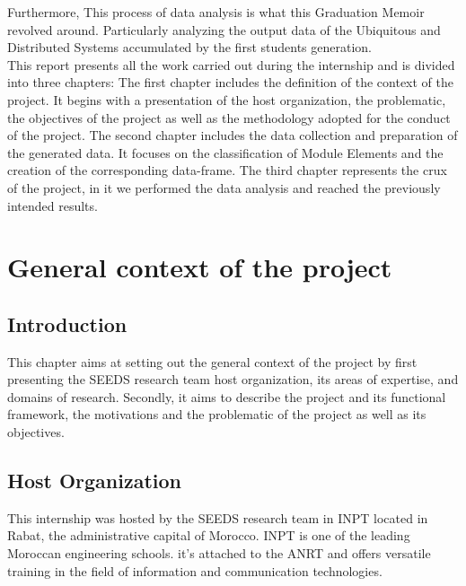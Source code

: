 \documentclass[12pt]{extreport}
\begin{document}
Furthermore, This process of data analysis is what this Graduation Memoir revolved around. Particularly analyzing the output data of the Ubiquitous and Distributed Systems accumulated by the first students generation.\\


This report presents all the work carried out during the internship and is divided into three chapters:
The first chapter includes the definition of the context of the project. It begins with a presentation of the host organization, the problematic, the objectives of the project as well as the methodology adopted for the conduct of the project. The second chapter includes the data collection and preparation of the generated data. It focuses on the classification of Module Elements and the creation of the corresponding data-frame. The third chapter represents the crux of the project, in it we performed the data analysis and reached the previously intended results. 

\chapter{General context of the project}

\section{Introduction}\label{sec:intro}

This chapter aims at setting out the general context of the project by first presenting the  SEEDS research team host organization, its areas of expertise, and domains of research. Secondly, it aims to describe the project and its functional framework, the motivations and the problematic of the project as well as its objectives.


\section{Host Organization}

This internship was hosted by the SEEDS research team in INPT located in Rabat, the administrative capital of Morocco. INPT is one of the leading Moroccan engineering schools. it's attached to the ANRT and offers versatile training in the field of information and communication technologies. 
\end{document}

